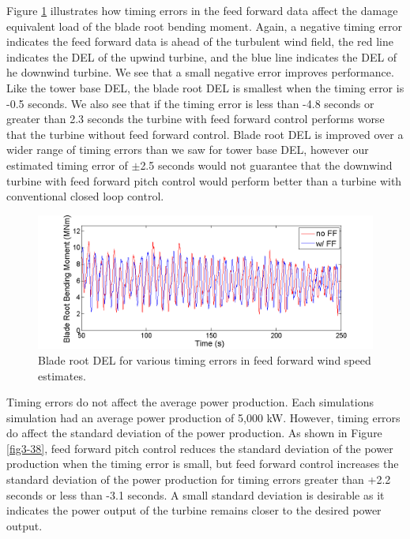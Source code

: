 Figure \ref{fig3-37} illustrates how timing errors in the feed forward data affect the damage equivalent load of the blade root bending moment. Again, a negative timing error indicates the feed forward data is ahead of the turbulent wind field, the red line indicates the DEL of the upwind turbine, and the blue line indicates the DEL of he downwind turbine. We see that a small negative error improves performance. Like the tower base DEL, the blade root DEL is smallest when the timing error is -0.5 seconds. We also see that if the timing error is less than -4.8 seconds or greater than 2.3 seconds the turbine with feed forward control performs worse that the turbine without feed forward control. Blade root DEL is improved over a wider range of timing errors than we saw for tower base DEL, however our estimated timing error of $\pm$2.5 seconds would not guarantee that the downwind turbine with feed forward pitch control would perform better than a turbine with conventional closed loop control.


\begin{figure}[htbp]
	\centering
		\includegraphics[width = \linewidth]{Figures/ch3Figures/fig3-35.png}
		
	\caption{Blade root DEL for various timing errors in feed forward wind speed estimates.}
	\label{fig3-37}
\end{figure}

Timing errors do not affect the average power production. Each simulations simulation had an average power production of 5,000 kW. However, timing errors do affect the standard deviation of the power production. As shown in Figure \ref{fig3-38}, feed forward pitch control reduces the standard deviation of the power production when the timing error is small, but feed forward control increases the standard deviation of the power production for timing errors greater than +2.2 seconds or less than -3.1 seconds. A small standard deviation is desirable as it indicates the power output of the turbine remains closer to the desired power output.

